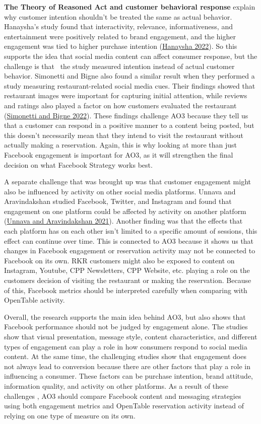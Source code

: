 \documentclass[
  12pt,
  letterpaper,
  DIV=11,
  numbers=noendperiod]{scrartcl}
\begin{document}
\textbf{The Theory of Reasoned Act and customer behavioral response}
explain why customer intention shouldn't be treated the same as actual
behavior. Hanaysha's study found that interactivity, relevance,
informativeness, and entertainment were positively related to brand
engagement, and the higher engagement was tied to higher purchase
intention (\hyperref[ref-hanaysha2022]{Hanaysha 2022}). So this supports
the idea that social media content can affect consumer response, but the
challenge is that~ the study measured intention instead of actual
customer behavior. Simonetti and Bigne also found a similar result when
they performed a study measuring restaurant-related social media cues.
Their findings showed that restaurant images were important for
capturing initial attention, while reviews and ratings also played a
factor on how customers evaluated the restaurant
(\hyperref[ref-simonetti2022]{Simonetti and Bigne 2022}). These findings
challenge AO3 because they tell us that a customer can respond in a
positive manner to a content being posted, but this doesn't necessarily
mean that they intend to visit the restaurant without actually making a
reservation. Again, this is why looking at more than just Facebook
engagement is important for AO3, as it will strengthen the final
decision on what Facebook Strategy works best.~

A separate challenge that was brought up was that customer engagement
might also be influenced by activity on other social media platforms.
Unnava and Aravindakshan studied Facebook, Twitter, and Instagram and
found that engagement on one platform could be affected by activity on
another platform (\hyperref[ref-unnava2021]{Unnava and Aravindakshan
2021}). Another finding was that the effects that each platform has on
each other isn't limited to a specific amount of sessions, this effect
can continue over time. This is connected to AO3 because it shows us
that changes in Facebook engagement or reservation activity may not be
connected to Facebook on its own. RKR customers might also be exposed to
content on Instagram, Youtube, CPP Newsletters, CPP Website, etc.
playing a role on the customers decision of visiting the restaurant or
making the reservation. Because of this, Facebook metrics should be
interpreted carefully when comparing with OpenTable activity.~

Overall, the research supports the main idea behind AO3, but also shows
that Facebook performance should not be judged by engagement alone. The
studies show that visual presentation, message style, content
characteristics, and different types of engagement can play a role in
how consumers respond to social media content. At the same time, the
challenging studies show that engagement does not always lead to
conversion because there are other factors that play a role in
influencing a consumer. These factors can be purchase intention, brand
attitude, information quality, and activity on other platforms. As a
result of these challenges , AO3 should compare Facebook content and
messaging strategies using both engagement metrics and OpenTable
reservation activity instead of relying on one type of measure on its
own.~
\end{document}
